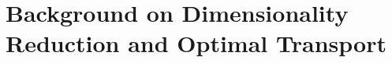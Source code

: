 \chapter{Background on Dimensionality Reduction and Optimal Transport}\label{chapter:Background}














